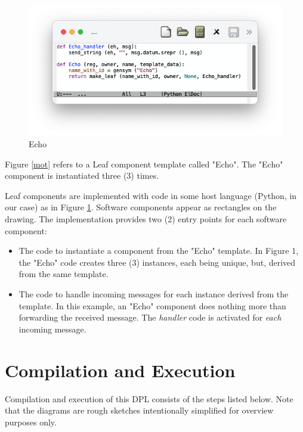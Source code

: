 \documentclass[10pt,anonymous,review]{acmart}
\begin{document}
\vspace{1\baselineskip}

\begin{figure}
    \centering
    \includegraphics[trim=1cm 1.9cm 1cm 1cm, clip, scale=0.4]{./media/echo.png}
    \caption{Echo}
    \label{fig:echo}
\end{figure}
Figure \ref{mot} refers to a Leaf component template called "Echo". The "Echo"
component is instantiated three (3) times. 

\vspace{5\baselineskip}

Leaf components are
implemented with code in some host language (Python, in our case) as in Figure \ref{fig:echo}. Software components
appear as rectangles on the drawing. The implementation provides two (2)
entry points for each software component:
\begin{itemize}
\setlength\itemsep{-0.3em}
\item The code to instantiate a component from the "Echo" template. In Figure
1, the "Echo" code creates three (3) instances, each being unique, but,
derived from the same template.

\item The code to handle incoming messages for each instance derived from the
template. In this example, an "Echo" component does nothing more than
forwarding the received message. The \emph{handler} code is activated for
\emph{each} incoming message.
\end{itemize}

\section{Compilation and Execution}
Compilation and execution of this DPL consists of the steps listed below. Note that the diagrams are rough sketches intentionally simplified
for overview purposes only.
\end{document}
